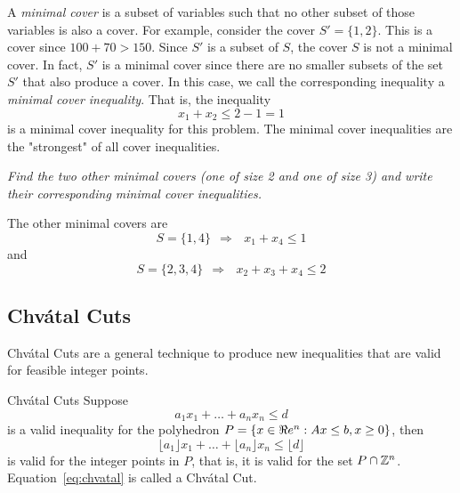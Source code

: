 A \emph{minimal cover} is a subset of variables such that no other subset of those variables is also a cover.  For example, consider the cover $S' = \{1,2\}$.  This is a cover since $100 + 70 > 150$.  Since $S'$ is a subset of $S$, the cover $S$ is not a minimal cover.  In fact, $S'$ is a minimal cover since there are no smaller subsets of the set $S'$ that also produce a cover.
In this case, we call the corresponding inequality a \emph{minimal cover inequality}.  That is, the inequality
\begin{equation}
x_1 + x_2 \leq 2 - 1 = 1
\end{equation}
is a minimal cover inequality for this problem.   The minimal cover inequalities are the "strongest" of all cover inequalities.

\emph{Find the two other minimal covers (one of size 2 and one of size 3) and write their corresponding minimal cover inequalities.}

\begin{solution}{}{}{}
The other minimal covers are 
\begin{equation}
S = \{1,4\} \ \ \Rightarrow \ \ \ x_1 + x_4 \leq 1
\end{equation}
and
\begin{equation}
S = \{2,3,4\} \ \ \Rightarrow \ \ \ x_2 + x_3 + x_4 \leq 2
\end{equation}
\end{solution}

\subsection{Chv\'atal Cuts}
\label{subsec:chvatal-cuts}

Chv\'atal Cuts are a general technique to produce new inequalities that are valid for feasible integer points.  

\begin{general}{Chv\'atal Cuts}{}
Suppose 
\begin{equation}
a_1 x_1 + \dots + a_n x_n \leq d
\end{equation}
is a valid inequality for the polyhedron $P = \{ x \in \Re e^n : Ax \leq b, x \geq 0\}$, then 
\begin{equation}
\label{eq:chvatal}
\lfloor a_1\rfloor x_1 + \dots + \lfloor a_n\rfloor  x_n \leq \lfloor d\rfloor
\end{equation}
is valid for the integer points in $P$, that is, it is valid for the set $P \cap \mathbb{Z}^n$.  Equation~\eqref{eq:chvatal} is called a Chv\'atal Cut.
\end{general}

